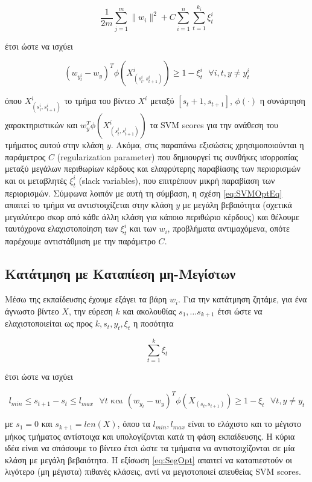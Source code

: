 \documentclass[11pt,a4paper,english,greek,twoside]{../Thesis}
\begin{document}
\begin{equation}\label{eq:SVMOpt}
    \frac{1}{2m} \sum_{j=1}^m \| w_i \|^2 +C \sum_{i=1}^n \sum_{t=1}^{k_i} \xi_t^i
\end{equation}

έτσι ώστε να ισχύει

\begin{equation}\label{eq:SVMOptEq}
    (w_{y_t^i}-w_y)^T \phi(X_{(s_t^i,s_{t+1}^i)}^i) \geq 1-\xi_t^i \text{ } \forall i,t,y \neq y_t^i
\end{equation}

όπου $X_{(s_t^i,s_{t+1}^i)}^i$ το τμήμα του βίντεο $X^i$ μεταξύ $[s_t+1,s_{t+1}]$, $\phi(\cdot)$ η συνάρτηση χαρακτηριστικών και $w_y^T \phi(X_{(s_t^i,s_{t+1}^i)}^i)$ τα SVM scores για την ανάθεση του τμήματος αυτού στην κλάση $y$. Ακόμα, στις παραπάνω εξισώσεις χρησιμοποιούνται η παράμετρος $C$ (regularization parameter) που δημιουργεί τις συνθήκες ισορροπίας μεταξύ μεγάλων περιθωρίων κέρδους και ελαφρύτερης παραβίασης των περιορισμών και οι μεταβλητές $\xi_t^i$ (slack variables), που επιτρέπουν μικρή παραβίαση των περιορισμών. Σύμφωνα λοιπόν με αυτή τη σύμβαση, η σχέση \ref{eq:SVMOptEq} απαιτεί το τμήμα να αντιστοιχίζεται στην κλάση $y$ με μεγάλη βεβαιότητα (σχετικά μεγαλύτερο σκορ από κάθε άλλη κλάση για κάποιο περιθώριο κέρδους) και θέλουμε ταυτόχρονα ελαχιστοποίηση των $\xi_t^i$ και των $w_i$, προβλήματα αντιμαχόμενα, οπότε παρέχουμε αντιστάθμιση με την παράμετρο $C$.

\subsection{Κατάτμηση με Καταπίεση μη-Μεγίστων}
Μέσω της εκπαίδευσης έχουμε εξάγει τα βάρη $w_i$. Για την κατάτμηση ζητάμε, για ένα άγνωστο βίντεο $X$, την εύρεση $k$ και ακολουθίας $s_1, \dots s_{k+1}$ έτσι ώστε να ελαχιστοποιείται ως προς $k, s_t, y_t, \xi_t$ η ποσότητα

\begin{equation}\label{eq:SegOpt}
    \sum_{t=1}^k \xi_t
\end{equation}

έτσι ώστε να ισχύει

\begin{equation}\label{eq:SegOptEq}
    l_{min} \leq s_{t+1}-s_t \leq l_{max} \text{ } \forall t \text{ και } (w_{y_t}-w_y)^T \phi(X_{(s_t,s_{t+1})}) \geq 1-\xi_t \text{ } \forall t,y \neq y_t
\end{equation}

με $s_1=0$ και $s_{k+1}=len(X)$, όπου τα $l_{min}, l_{max}$ είναι το ελάχιστο και το μέγιστο μήκος τμήματος αντίστοιχα και υπολογίζονται κατά τη φάση εκπαίδευσης. Η κύρια ιδέα είναι να σπάσουμε το βίντεο έτσι ώστε τα τμήματα να αντιστοιχίζονται σε μία κλάση με μεγάλη βεβαιότητα. Η εξίσωση \ref{eq:SegOpt} απαιτεί να καταπιεστούν οι λιγότερο (μη μέγιστα) πιθανές κλάσεις, αντί να μεγιστοποιεί απευθείας SVM scores.
\end{document}
